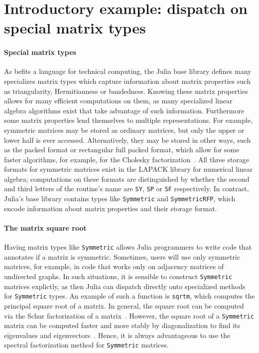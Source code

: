 \section{Introductory example: dispatch on special matrix types}

\paragraph{Special matrix types}
As befits a language for technical computing, the Julia base library defines
many specializes matrix types which capture information about matrix properties
such as triangularity, Hermitianness or bandedness. Knowing these matrix
properties allows for many efficient computations on them, as many specialized
linear algebra algorithms exist that take advantage of such information.
Furthermore some matrix properties lend themselves to multiple representations.
For example, symmetric matrices may be stored as ordinary matrices, but only
the upper or lower half is ever accessed. Alternatively, they may be stored in
other ways, such as the packed format or rectangular full packed format, which
allow for some faster algorithms, for example, for the Cholesky
factorization~\cite{Gustavson2010}. All three storage formats for symmetric
matrices exist in the LAPACK library for numerical linear algebra; computations
on these formats are distinguished by whether the second and third letters of
the routine's name are \lstinline|SY|, \lstinline|SP| or \lstinline|SF|
respectively. In contrast, Julia's base library contains types like
\lstinline|Symmetric| and \lstinline|SymmetricRFP|, which encode information
about matrix properties and their storage format.

\paragraph{The matrix square root}
Having matrix types like \lstinline|Symmetric| allows Julia programmers to
write code that annotates if a matrix is symmetric. Sometimes, users
will use only symmetric matrices, for example, in code that
works only on adjacency matrices of undirected graphs. In such situations,
it is sensible to construct \lstinline|Symmetric| matrices explictly, as then
Julia can dispatch directly onto specialized methods for \lstinline|Symmetric|
types. An example of such a function is \lstinline|sqrtm|, which computes the
principal square root of a matrix. In general, the square root can be computed
via the Schur factorization of a matrix~\cite{Golub2013}. However, the square
root of a \lstinline|Symmetric| matrix can be computed faster and more stably
by diagonalization to find its eigenvalues and
eigenvectors~\cite{Higham2008,Golub2013}. Hence, it is always advantageous to
use the spectral factorization method for \lstinline|Symmetric| matrices.


